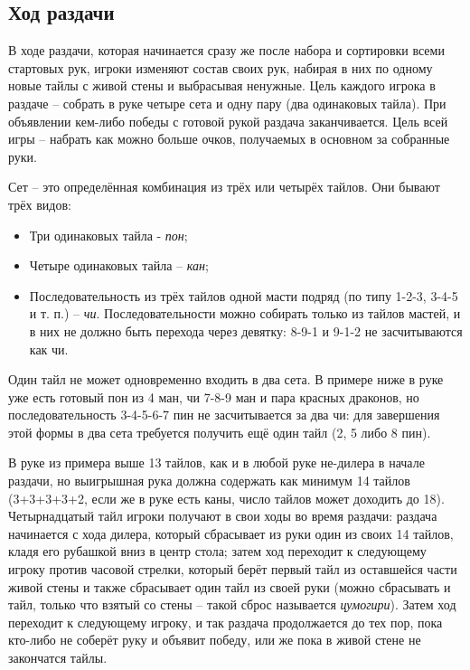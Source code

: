 \subsection{Ход раздачи}

В ходе раздачи, которая начинается сразу же после набора и сортировки всеми стартовых рук, игроки изменяют состав своих рук, набирая в них по одному новые тайлы с живой стены и выбрасывая ненужные. Цель каждого игрока в раздаче – собрать в руке четыре сета и одну пару (два одинаковых тайла). При объявлении кем-либо победы с готовой рукой раздача заканчивается. Цель всей игры – набрать как можно больше очков, получаемых в основном за собранные руки.

Сет – это определённая комбинация из трёх или четырёх тайлов. Они бывают трёх видов:
\begin{itemize}
	\item Три одинаковых тайла - \textit{пон};
	\item Четыре одинаковых тайла – \textit{кан};
	\item Последовательность из трёх тайлов одной масти подряд (по типу 1-2-3, 3-4-5 и т. п.) – \textit{чи}. Последовательности можно собирать только из тайлов мастей, и в них не должно быть перехода через девятку: 8-9-1 и 9-1-2 не засчитываются как чи.
\end{itemize}

Один тайл не может одновременно входить в два сета. В примере ниже в руке уже есть готовый пон из 4 ман, чи 7-8-9 ман и пара красных драконов, но последовательность 3-4-5-6-7 пин не засчитывается за два чи: для завершения этой формы в два сета требуется получить ещё один тайл (2, 5 либо 8 пин).


В руке из примера выше 13 тайлов, как и в любой руке не-дилера в начале раздачи, но выигрышная рука должна содержать как минимум 14 тайлов (3+3+3+3+2, если же в руке есть каны, число тайлов может доходить до 18). Четырнадцатый тайл игроки получают в свои ходы во время раздачи: раздача начинается с хода дилера, который сбрасывает из руки один из своих 14 тайлов, кладя его рубашкой вниз в центр стола; затем ход переходит к следующему игроку против часовой стрелки, который берёт первый тайл из оставшейся части живой стены и также сбрасывает один тайл из своей руки (можно сбрасывать и тайл, только что взятый со стены – такой сброс называется \textit{цумогири}). Затем ход переходит к следующему игроку, и так раздача продолжается до тех пор, пока кто-либо не соберёт руку и объявит победу, или же пока в живой стене не закончатся тайлы. 

